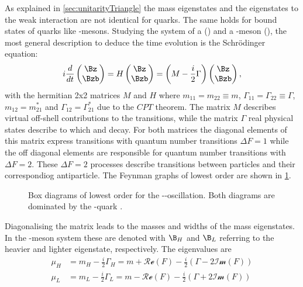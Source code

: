 As explained in \cref{sec:unitarityTriangle} the mass eigenstates and the eigenstates to the weak interaction are not identical for
quarks. The same holds for bound states of quarks like \B-mesons. Studying the system of a \Bz (\bquarkbar\dquark) and a \Bzb-meson
(\bquark\dquarkbar), the most general description to deduce the time evolution is the Schrödinger equation:
\begin{equation}
i\frac{d}{dt}\begin{pmatrix} \Bz \\ \Bzb \end{pmatrix} = H \begin{pmatrix} \Bz \\ \Bzb \end{pmatrix}
=\left(M-\frac{i}{2}\Gamma\right)\begin{pmatrix} \Bz \\ \Bzb \end{pmatrix},
\end{equation}
with the hermitian 2x2 matrices $M$ and $H$ where $m_{11}=m_{22}\equiv m$, $\Gamma_{11}=\Gamma_{22}\equiv\Gamma$, $m_{12}=m_{21}^\ast$ and $\Gamma_{12}=\Gamma_{21}^\ast$ due to the $CPT$ theorem.
The matrix $M$ describes virtual off-shell contributions to the transitions, while the matrix $\Gamma$ real physical states describe to which \Bz and \Bzb decay.
For both matrices the diagonal elements of this matrix express transitions with quantum number transitions $\Delta F=1$ while the off diagonal elements are responsible for quantum number transitions with $\Delta F=2$.
These $\Delta F=2$ processes describe transitions between particles and their correspondiog antiparticle.
The Feynman graphs of lowest order are shown in \cref{fig:FeynmanMixing}.
\begin{figure}[tbp]
	\centering
	
	\hspace{0.5cm}
	
	\caption{Box diagrams of lowest order for the \Bz-\Bzb-oscillation. Both diagrams are dominated by the \tquark-quark \cite{Ellis:2016jkw}.}
	\label{fig:FeynmanMixing}
\end{figure}
Diagonalising the matrix leads to the masses and widths of the mass eigenstates.
In the \Bz-meson system these are denoted with $\B_H$ and $\B_L$ referring to the heavier and lighter eigenstate, respectively.
The eigenvalues are
\begin{equation}
\begin{split}
\mu_H &= m_H-\frac{i}{2}\Gamma_H = m + \mathcal{Re}\left(F\right)-\frac{i}{2}\left(\Gamma-2\mathcal{Im}\left(F\right)\right)\\
\mu_L &= m_L-\frac{i}{2}\Gamma_L = m - \mathcal{Re}\left(F\right)-\frac{i}{2}\left(\Gamma+2\mathcal{Im}\left(F\right)\right)\label{eq:Mass_eigenvalues}
\end{split}
\end{equation}
